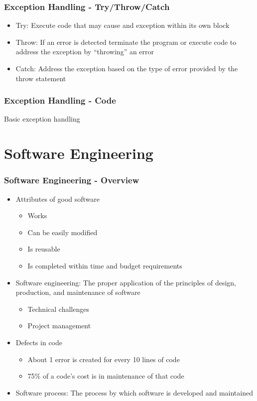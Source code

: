 \documentclass[c, aspectratio=169]{beamer}
\begin{document}
\begin{frame}\frametitle{Exception Handling - Try/Throw/Catch}
\begin{itemize}
\item Try: Execute code that may cause and exception within its own block
\item Throw: If an error is detected terminate the program or execute code to address the exception by ``throwing'' an error
\item Catch: Address the exception based on the type of error provided by the throw statement
\end{itemize}
\end{frame}

\begin{frame}\frametitle{Exception Handling - Code}
Basic exception handling

\end{frame}

\section{Software Engineering}
\begin{frame}\frametitle{Software Engineering - Overview}
\begin{itemize}
\item Attributes of good software
	\begin{itemize}
	\item Works
	\item Can be easily modified
	\item Is reusable
	\item Is completed within time and budget requirements
	\end{itemize}
\item Software engineering: The proper application of the principles of design, production, and maintenance of software
	\begin{itemize}
	\item Technical challenges
	\item Project management
	\end{itemize}
\item Defects in code
	\begin{itemize}
	\item About 1 error is created for every 10 lines of code
	\item 75\% of a code's cost is in maintenance of that code
	\end{itemize}
\item Software process: The process by which software is developed and maintained
\end{itemize}
\end{frame}
\end{document}
